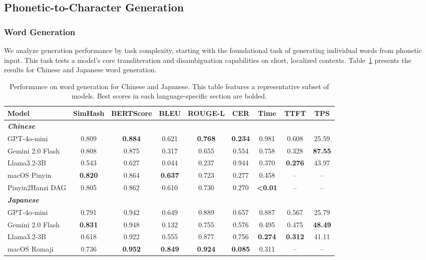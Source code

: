 \documentclass[10pt, a4paper]{article}
\begin{document}
\subsection{Phonetic-to-Character Generation}

\subsubsection{Word Generation}
We analyze generation performance by task complexity, starting with the foundational task of generating individual words from phonetic input. This task tests a model's core transliteration and disambiguation capabilities on short, localized contexts.
Table~\ref{tab:word_gen_results} presents the results for Chinese and Japanese word generation. 

\begin{table}[h]
\centering
\small
\caption{Performance on word generation for Chinese and Japanese. This table features a representative subset of models. Best scores in each language-specific section are bolded.}
\label{tab:word_gen_results}
\begin{tabular}{l cccccccc}
\toprule
\textbf{Model} & \textbf{SimHash} & \textbf{BERTScore} & \textbf{BLEU} & \textbf{ROUGE-L} & \textbf{CER} & \textbf{Time} & \textbf{TTFT} & \textbf{TPS} \\
\midrule
\multicolumn{9}{l}{\textit{\textbf{Chinese}}} \\
GPT-4o-mini & 0.809 & \textbf{0.884} & 0.621 & \textbf{0.768} & \textbf{0.234} & 0.981 & 0.608 & 25.59 \\
Gemini 2.0 Flash & 0.808 & 0.875 & 0.317 & 0.655 & 0.554 & 0.758 & 0.328 & \textbf{87.55} \\
Llama3.2-3B & 0.543 & 0.627 & 0.044 & 0.237 & 0.944 & {0.370} & \textbf{0.276} & 43.97 \\
macOS Pinyin & \textbf{0.820} & 0.864 & \textbf{0.637} & 0.723 & 0.277 & 0.458 & -- & -- \\
Pinyin2Hanzi DAG & 0.805 & 0.862 & 0.610 & 0.730 & 0.270 & \textbf{<0.01} & -- & -- \\
\midrule
\multicolumn{9}{l}{\textit{\textbf{Japanese}}} \\
GPT-4o-mini & 0.791 & 0.942 & {0.649} & {0.889} & 0.657 & 0.887 & 0.567 & 25.79 \\
Gemini 2.0 Flash & \textbf{0.831} & 0.948 & 0.132 & 0.755 & {0.576} & 0.495 & 0.475 & \textbf{48.49} \\
Llama3.2-3B & 0.618 & 0.922 & 0.555 & 0.877 & 0.756 & \textbf{0.274} & \textbf{0.312} & 41.11 \\
macOS Romaji & 0.736 & \textbf{0.952} & \textbf{0.849} & \textbf{0.924} & \textbf{0.085} & 0.311 & -- & -- \\
\bottomrule
\end{tabular}
\end{table}
\end{document}
